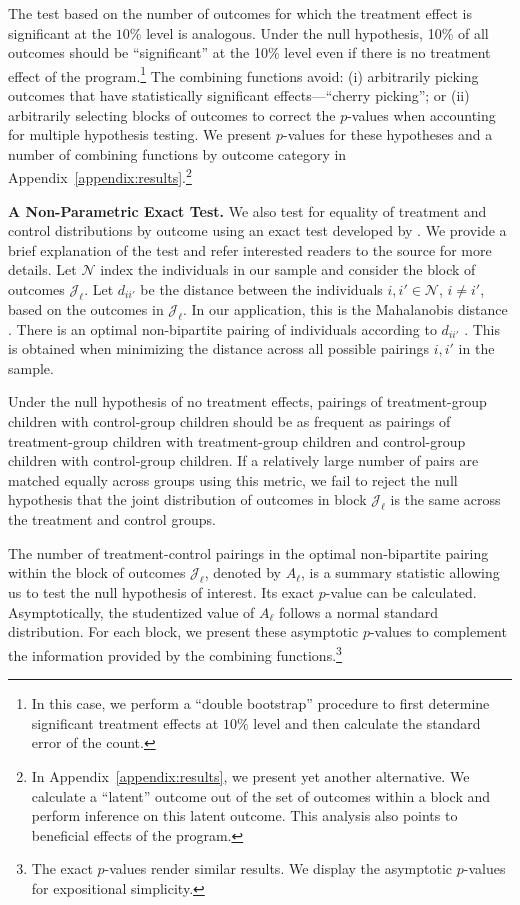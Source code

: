 The test based on the number of outcomes for which the treatment effect is significant at the $10\%$ level is analogous. Under the null hypothesis, 10\% of all outcomes should be ``significant'' at the 10\% level even if there is no treatment effect of the program.\footnote{In this case, we perform a ``double bootstrap'' procedure to first determine significant treatment effects at $10\%$ level and then calculate the standard error of the count.} The combining functions avoid: (i) arbitrarily picking outcomes that have statistically significant effects---``cherry picking''; or (ii) arbitrarily selecting blocks of outcomes to correct the $p$-values when accounting for multiple hypothesis testing. We present $p$-values for these hypotheses and a number of combining functions by outcome category in Appendix~\ref{appendix:results}.\footnote{In Appendix~\ref{appendix:results}, we present yet another alternative. We calculate a ``latent'' outcome out of the set of outcomes within a block and perform inference on this latent outcome. This analysis also points to beneficial effects of the program.}

\textbf{A Non-Parametric Exact Test.} We also test for equality of treatment and control distributions by outcome using an exact test developed by \citet{Rosenbaum_2005_Distribution_JRSS}. We provide a brief explanation of the test and refer interested readers to the source for more details. Let $\mathcal{N}$ index the individuals in our sample and consider the block of outcomes $\mathcal{J}_\ell$. Let $d_{ii'}$ be the distance between the individuals $i, i' \in \mathcal{N}$, $i \neq i'$, based on the outcomes in $\mathcal{J}_\ell$. In our application, this is the Mahalanobis distance \citep{Mahalanobis_1936_PNISI}. There is an optimal non-bipartite pairing of individuals according to $d_{ii'}$ \citep{Derigs_1988_Solving_AOR}. This is obtained when minimizing the distance across all possible pairings $i, i'$ in the sample. 

Under the null hypothesis of no treatment effects, pairings of treatment-group children with control-group children should be as frequent as pairings of treatment-group children with treatment-group children and control-group children with control-group children. If a relatively large number of pairs are matched equally across groups using this metric, we fail to reject the null hypothesis that the joint distribution of outcomes in block $\mathcal{J}_\ell$ is the same across the treatment and control groups.

The number of treatment-control pairings in the optimal non-bipartite pairing within the block of outcomes $\mathcal{J}_\ell$, denoted by $A_\ell$, is a summary statistic allowing us to test the null hypothesis of interest. Its exact $p$-value can be calculated. Asymptotically, the studentized value of $A_\ell$ follows a normal standard distribution. For each block, we present these asymptotic $p$-values to complement the information provided by the combining functions.\footnote{The exact $p$-values render similar results. We display the asymptotic $p$-values for expositional simplicity.}
